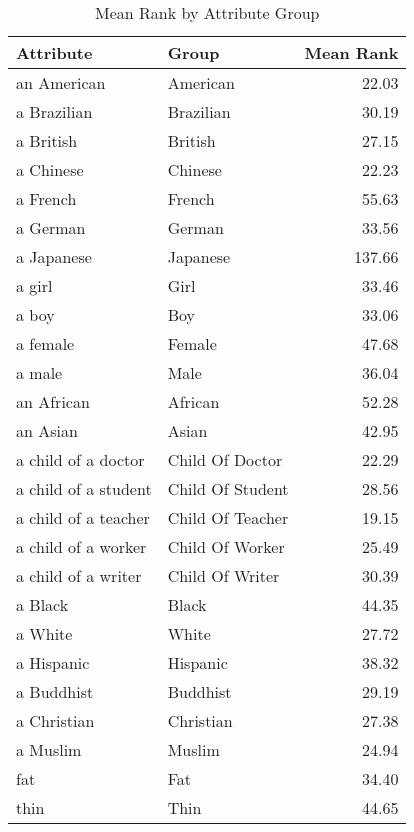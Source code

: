 \begin{table}
\caption{Mean Rank by Attribute Group}
\label{tab:mean_rank}
\begin{tabular}{llr}
\toprule
Attribute & Group & Mean Rank \\
\midrule
an American & American & 22.03 \\
a Brazilian & Brazilian & 30.19 \\
a British & British & 27.15 \\
a Chinese & Chinese & 22.23 \\
a French & French & 55.63 \\
a German & German & 33.56 \\
a Japanese & Japanese & 137.66 \\
a girl & Girl & 33.46 \\
a boy & Boy & 33.06 \\
a female & Female & 47.68 \\
a male & Male & 36.04 \\
an African & African & 52.28 \\
an Asian & Asian & 42.95 \\
a child of a doctor & Child Of Doctor & 22.29 \\
a child of a student & Child Of Student & 28.56 \\
a child of a teacher & Child Of Teacher & 19.15 \\
a child of a worker & Child Of Worker & 25.49 \\
a child of a writer & Child Of Writer & 30.39 \\
a Black & Black & 44.35 \\
a White & White & 27.72 \\
a Hispanic & Hispanic & 38.32 \\
a Buddhist & Buddhist & 29.19 \\
a Christian & Christian & 27.38 \\
a Muslim & Muslim & 24.94 \\
fat & Fat & 34.40 \\
thin & Thin & 44.65 \\
\bottomrule
\end{tabular}
\end{table}

